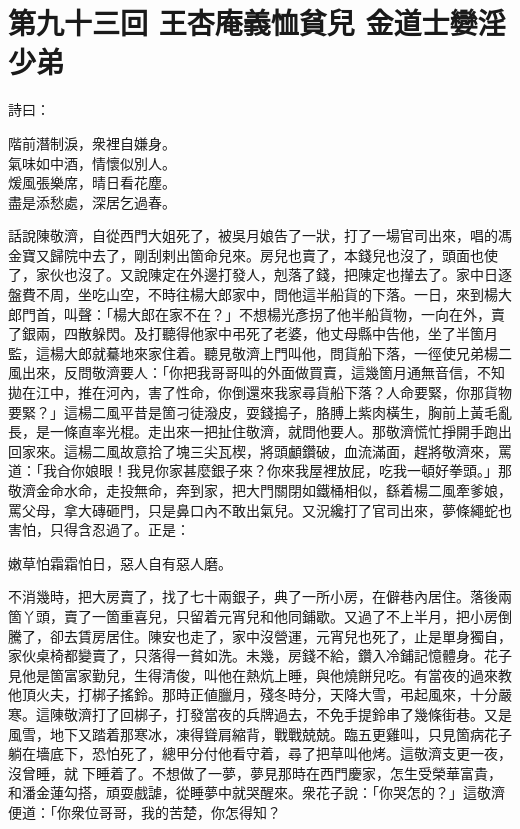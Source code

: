 
\chapter*{第九十三回 王杏庵義恤貧兒 金道士孌淫少弟}


詩曰：

\begin{myquote}
階前潛制淚，衆裡自嫌身。\\氣味如中酒，情懷似別人。\\煖風張樂席，晴日看花塵。\\盡是添愁處，深居乞過春。
\end{myquote}

話說陳敬濟，自從西門大姐死了，被吳月娘告了一狀，打了一場官司出來，唱的馮金寶又歸院中去了，剛刮剌出箇命兒來。{}房兒也賣了，本錢兒也沒了，頭面也使了，家伙也沒了。又說陳定在外邊打發人，剋落了錢，把陳定也攆去了。家中日逐盤費不周，坐吃山空，不時往楊大郎家中，問他這半船貨的下落。一日，來到楊大郎門首，叫聲：「楊大郎在家不在？」不想楊光彥拐了他半船貨物，一向在外，賣了銀兩，四散躲閃。及打聽得他家中弔死了老婆，他丈母縣中告他，坐了半箇月監，這楊大郎就驀地來家住着。聽見敬濟上門叫他，問貨船下落，一徑使兄弟楊二風出來，反問敬濟要人：「你把我哥哥叫的外面做買賣，這幾箇月通無音信，不知拋在江中，推在河內，害了性命，你倒還來我家尋貨船下落？人命要緊，你那貨物要緊？」這楊二風平昔是箇刁徒潑皮，耍錢搗子，胳膊上紫肉橫生，胸前上黃毛亂長，是一條直率光棍。走出來一把扯住敬濟，就問他要人。那敬濟慌忙掙開手跑出回家來。這楊二風故意拾了塊三尖瓦楔，將頭顱鑽破，血流滿面，趕將敬濟來，罵道：「我㒲你娘眼！我見你家甚麼銀子來？你來我屋裡放屁，吃我一頓好拳頭。」那敬濟金命水命，走投無命，奔到家，把大門關閉如鐵桶相似，繇着楊二風牽爹娘，罵父母，拿大磚砸門，只是鼻口內不敢出氣兒。又況纔打了官司出來，夢條繩蛇也害怕，只得含忍過了。正是：

\begin{myquote}
嫩草怕霜霜怕日，惡人自有惡人磨。
\end{myquote}

不消幾時，把大房賣了，找了七十兩銀子，典了一所小房，在僻巷內居住。落後兩箇丫頭，賣了一箇重喜兒，只留着元宵兒和他同鋪歇。又過了不上半月，把小房倒騰了，卻去賃房居住。陳安也走了，家中沒營運，元宵兒也死了，止是單身獨自，家伙桌椅都變賣了，只落得一貧如洗。{}未幾，房錢不給，鑽入冷鋪記憶體身。花子見他是箇富家勤兒，生得清俊，叫他在熱炕上睡，與他燒餅兒吃。有當夜的過來教他頂火夫，打梆子搖鈴。那時正値臘月，殘冬時分，天降大雪，弔起風來，十分嚴寒。這陳敬濟打了回梆子，打發當夜的兵牌過去，不免手提鈴串了幾條街巷。又是風雪，地下又踏着那寒冰，凍得聳肩縮背，戰戰兢兢。臨五更雞叫，只見箇病花子躺在墻底下，恐怕死了，總甲分付他看守着，尋了把草叫他烤。這敬濟支更一夜，沒曾睡，就𢱉下睡着了。不想做了一夢，夢見那時在西門慶家，怎生受榮華富貴，和潘金蓮勾搭，頑耍戲謔，從睡夢中就哭醒來。衆花子說：「你哭怎的？」這敬濟便道：「你衆位哥哥，我的苦楚，你怎得知？

